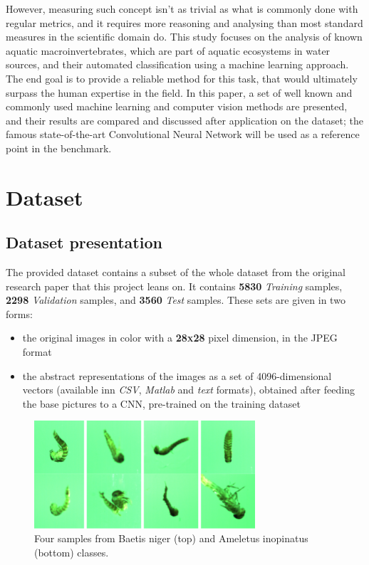 \documentclass[conference]{IEEEtran}
\begin{document}
However, measuring such concept isn't as trivial as what is commonly done with regular metrics, and it requires more reasoning and analysing than most standard measures in the scientific domain do. This study focuses on the analysis of known aquatic macroinvertebrates, which are part of aquatic ecosystems in water sources, and their automated classification using a machine learning approach. The end goal is to provide a reliable method for this task, that would ultimately surpass the human expertise in the field. In this paper, a set of well known and commonly used machine learning and computer vision methods are presented, and their results are compared and discussed after application on the dataset; the famous state-of-the-art Convolutional Neural Network will be used as a reference point in the benchmark.

\section{Dataset}

\subsection{Dataset presentation}
The provided dataset contains a subset of the whole dataset from the original research paper that this project leans on. It contains \textbf{5830} \emph{Training} samples, \textbf{2298} \emph{Validation} samples, and \textbf{3560} \emph{Test} samples. These sets are given in two forms:
\begin{itemize}
    \item the original images in color with a \textbf{\textsc{28x28}} pixel dimension, in the JPEG format
    \item the abstract representations of the images as a set of 4096-dimensional vectors (available inn \emph{CSV}, \emph{Matlab} and \emph{text} formats), obtained after feeding the base pictures to a CNN, pre-trained on the training dataset
\end{itemize}

\begin{figure}[htbp]
    \centerline{\includegraphics[height=4cm]{sample_macrobitches}}
    \caption{Four samples from Baetis niger (top) and Ameletus inopinatus (bottom) classes.}
    \label{fig}
\end{figure}
\end{document}
